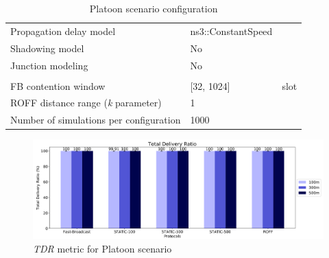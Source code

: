 \begin{table}[H]
\begin{tabularx}{\textwidth}{l | l  l}
				Propagation delay model					& ns3::ConstantSpeed	&		\\
				Shadowing model							& No					&		\\
				Junction modeling						& No					&		\\
				\midrule[1pt]
				\rowcolor{P} \multicolumn{3}{c}{Protocols configuration} \\
				\midrule[1pt]
				FB contention window					& [32, 1024]			& slot	\\
				ROFF distance range (\textit{k} parameter) & 1					&		\\	
				\midrule[1pt]
				Number of simulations per configuration	& 1000					&		\\
				\bottomrule
			\end{tabularx}
			\caption{Platoon scenario configuration}
			\label{table:platoon}
		\end{table}
	
		\begin{figure}[H]
			\centering
			\includegraphics[width=1.1\textwidth]{immagini/platoon-15km/tdr}
			\caption{\textit{TDR} metric for Platoon scenario}
			\label{fig:metric-platoon-15km-0}
		\end{figure}
	
